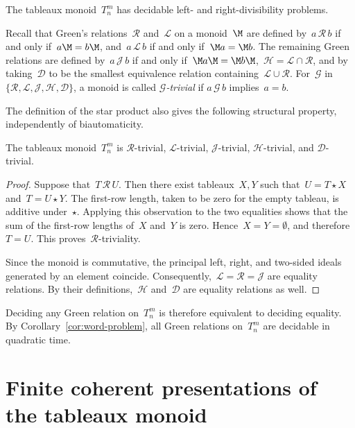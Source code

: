\documentclass[a4paper, twoside, 11pt, english]{article}
\begin{document}
\begin{corollary}
The tableaux monoid~$T_n^m$ has decidable left- and
right-divisibility problems.
\end{corollary}

Recall that Green's relations~$\mathcal R$ and~$\mathcal L$ on a monoid~$\M$ are defined by~$a\,\mathcal R\,b$ if and only if~$a\M=b\M$, and~$a\,\mathcal L\,b$ if and only if~$\M a=\M b$. 
The remaining Green relations are defined by~$
a\,\mathcal J\,b$ if and only if~$\M a\M=\M b\M$,~$\mathcal H=\mathcal L\cap\mathcal R$,
and by taking~$\mathcal D$ to be the smallest equivalence relation
containing~$\mathcal L\cup\mathcal R$.
For~$\mathcal G$ in~$
\{\mathcal R,\mathcal L,\mathcal J,\mathcal H,\mathcal D\}$,
a monoid is called \emph{$\mathcal G$-trivial} if
$a\,\mathcal G\,b$ implies~$a=b$.

The definition of the star product also gives the following
structural property, independently of biautomaticity.

\begin{corollary}
\label{cor:green-trivial}
The tableaux monoid~$T_n^m$ is
$\mathcal R$-trivial, $\mathcal L$-trivial, $\mathcal J$-trivial,
$\mathcal H$-trivial, and $\mathcal D$-trivial.
\end{corollary}

\begin{proof}
Suppose that~$T\,\mathcal R\,U$.
Then there exist tableaux~$X,Y$ such that~$U=T\star X$ and~$T=U\star Y$.
The first-row length, taken to be zero for the empty tableau,
is additive under~$\star$.
Applying this observation to the two equalities shows that
the sum of the first-row lengths of~$X$ and~$Y$ is zero.
Hence~$X=Y=\emptyset$, and therefore~$T=U$.
This proves~$\mathcal R$-triviality.

Since the monoid is commutative, the principal left, right,
and two-sided ideals generated by an element coincide.
Consequently,~$\mathcal L=\mathcal R=\mathcal J$ are equality
relations. By their definitions,~$\mathcal H$ and~$\mathcal D$
are equality relations as well.
\end{proof}

\begin{remark}
Deciding any Green relation on~$T_n^m$ is therefore equivalent
to deciding equality. By Corollary~\ref{cor:word-problem},
all Green relations on~$T_n^m$ are decidable in quadratic time.
\end{remark}


\section{Finite coherent presentations of the tableaux monoid}
\label{S:ColumnCoherentPresentationsTableauxMonoid}
\end{document}
